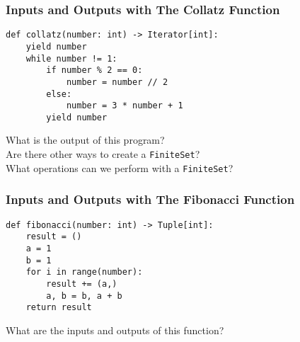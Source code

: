 \documentclass[14pt,aspectratio=169]{beamer}
\begin{document}
%
\begin{frame}[fragile]
  \frametitle{Inputs and Outputs with The Collatz Function}
  \hspace*{-.2in}
  \begin{minipage}{6in}
    \vspace*{.25in}
    \begin{verbatim}
def collatz(number: int) -> Iterator[int]:
    yield number
    while number != 1:
        if number % 2 == 0:
            number = number // 2
        else:
            number = 3 * number + 1
        yield number
    \end{verbatim}
  \end{minipage}
  \vspace*{.25in}
  \begin{center}
    \normalsize \noindent What is the output of this program? \\
    \normalsize \noindent Are there other ways to create a {\tt FiniteSet}? \\
    \normalsize \noindent What operations can we perform with a {\tt FiniteSet}? \\
  \end{center}
\end{frame}

%
\begin{frame}[fragile]
  \frametitle{Inputs and Outputs with The Fibonacci Function}
  \hspace*{-.2in}
  \begin{minipage}{6in}
    \vspace*{.15in}
    \begin{verbatim}
def fibonacci(number: int) -> Tuple[int]:
    result = ()
    a = 1
    b = 1
    for i in range(number):
        result += (a,)
        a, b = b, a + b
    return result
    \end{verbatim}
  \end{minipage}
  \vspace*{.025in}
  \begin{center}
    \normalsize \noindent What are the inputs and outputs of this function? \\
  \end{center}
\end{frame}
\end{document}
